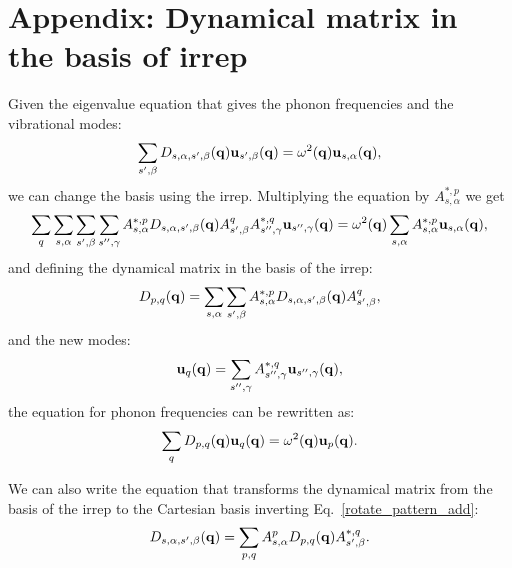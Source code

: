 \documentclass[12pt,a4paper,twoside]{report}
\begin{document}
\section{Appendix: Dynamical matrix in the basis of irrep}
Given the eigenvalue equation that gives the phonon frequencies and the vibrational modes:
\begin{equation}
\sum_{s',\beta} D_{s,\alpha,s',\beta}({\bf q})
{\bf u}_{s',\beta}({\bf q})
= \omega^2({\bf q}) {\bf u}_{s,\alpha}({\bf q}),
\end{equation}
we can change the basis using the irrep. Multiplying the equation by $A^{*,p}_{s,\alpha}$ we get
\begin{equation}
\sum_q \sum_{s,\alpha} \sum_{s',\beta} \sum_{s'',\gamma} A^{*,p}_{s,\alpha} D_{s,\alpha,s',\beta}({\bf q})
A^{q}_{s',\beta} A^{*,q}_{s'',\gamma}
{\bf u}_{s'',\gamma}({\bf q})
= \omega^2({\bf q}) \sum_{s,\alpha} A^{*,p}_{s,\alpha}{\bf u}_{s,\alpha}({\bf q}),
\end{equation}
and defining the dynamical matrix in the basis of the irrep:
\begin{equation}
D_{p,q}({\bf q}) =\sum_{s,\alpha} \sum_{s',\beta} A^{*,p}_{s,\alpha} D_{s,\alpha,s',\beta}({\bf q}) A^{q}_{s',\beta},
\label{rotate_pattern_add}
\end{equation}
and the new modes:
\begin{equation}
{\bf u}_{q}({\bf q}) = \sum_{s'',\gamma} A^{*,q}_{s'',\gamma}
{\bf u}_{s'',\gamma}({\bf q}),
\end{equation}
the equation for phonon frequencies can be rewritten as:
\begin{equation}
\sum_q  D_{p,q}({\bf q})
{\bf u}_{q}({\bf q})
= \omega^2({\bf q}){\bf u}_{p}({\bf q}).
\end{equation}

We can also write the equation that transforms the dynamical matrix from the basis of the irrep to the Cartesian basis inverting Eq.~\ref{rotate_pattern_add}:
\begin{equation}
D_{s,\alpha,s',\beta}({\bf q}) =\sum_{p,q}  A^{p}_{s,\alpha} D_{p,q}({\bf q}) A^{*,q}_{s',\beta}.
\label{dyn_pattern_to_cart}
\end{equation}
\end{document}

